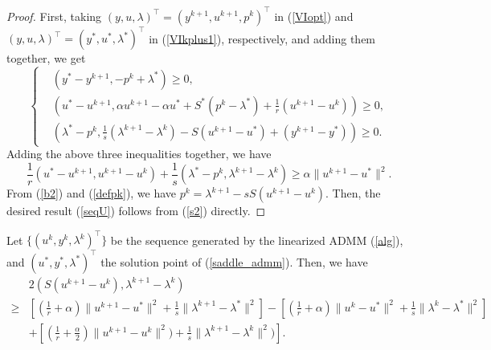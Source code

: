 \documentclass[final]{siamart171218}
\theoremstyle{remark}
\begin{document}
\begin{proof}
	
	First, taking $(y,u,\lambda)^\top=(y^{k+1}, u^{k+1}, p^{k})^\top$  in (\ref{VIopt}) and $(y,u,\lambda)^\top =  (y^*, u^*, \lambda^*)^\top$ in (\ref{VIkplus1}), respectively, and adding them together, we get
	\begin{equation*}
	\left \{ \begin{aligned}
	& \left(y^* -  y^{k+1}, -p^{k} + \lambda^* \right) \geq 0,\\
	& \left(u^* - u^{k+1}, \alpha u^{k+1} - \alpha u^* + S^* ( p^{k} - \lambda^*) + \frac{1}{r} (u^{k+1} - u^k)\right) \geq 0, \\
	& \left(\lambda^* -  p^{k},   \frac{1}{s}(\lambda^{k+1} - \lambda^k) - S(u^{k+1}-u^*) + (y^{k+1} - y^*) \right) \geq 0.
	\end{aligned}
	\right.
	\end{equation*}
Adding the above three inequalities together, we have
	\begin{equation}\label{s2}
	\frac{1}{r}(u^* -  u^{k+1},  u^{k+1} - u^k) + \frac{1}{s} (\lambda^* - p^k,  \lambda^{k+1}  - \lambda^k) \geq  \alpha \|u^{k+1} - u^* \|^2.
	\end{equation}
From (\ref{b2}) and  (\ref{defpk}), we have $p^{k} = \lambda^{k+1} - s S(u^{k+1}-u^k) $. Then, the desired result (\ref{seqU}) follows from (\ref{s2}) directly.
\end{proof}


\begin{lemma}
Let $\{(u^k, y^k, \lambda^k)^\top\}$ be the sequence generated by the linearized ADMM (\ref{alg}), and $(u^*, y^*, \lambda^*)^\top$ the solution point of (\ref{saddle_admm}). Then, we have
	\begin{equation}
	\label{main_eq}
	\begin{aligned}
	&2(S(u^{k+1}- u^k),\lambda^{k+1}-\lambda^k  ) \\ \geq& [(\frac{1}{r} + \alpha ) \|u^{k+1}- u^*\|^2  + \frac{1}{s}\|\lambda^{k+1}- \lambda^*\|^2]  - [(\frac{1}{r} + \alpha )\|u^{k}- u^*\|^2 + \frac{1}{s}\|\lambda^k- \lambda^*\|^2] \\
	& + [(\frac{1}{r} + \frac{\alpha}{2} )\|u^{k+1}- u^{k}\|^2) + \frac{1}{s}\|\lambda^{k+1}- \lambda^k\|^2)]. \\
	\end{aligned}
	\end{equation}
\end{lemma}
\end{document}
